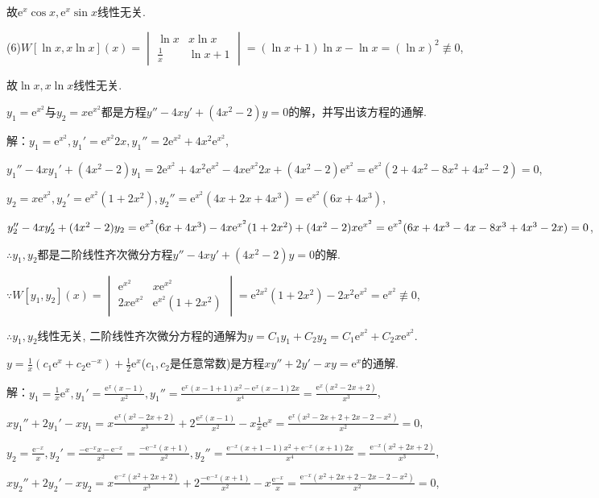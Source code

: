 \documentclass[12pt,UTF8]{ctexart}
\newcommand{\me}[0]{\mathrm e}
\begin{document}
\begin{enumerate}
故$\me^x\cos x,\me^x\sin x$线性无关.

(6)$W[\ln x,x\ln x](x)=\begin{vmatrix}\ln x&x\ln x\\ \frac1x&\ln x+1\end{vmatrix}=(\ln x+1)\ln x-\ln x=(\ln x)^2\not\equiv0$,

故$\ln x,x\ln x$线性无关.

$y_1=\me^{x^2}$与$y_2=x\me^{x^2}$都是方程$y''-4xy'+(4x^2-2)y=0$的解，并写出该方程的通解.

解：$y_1=\me^{x^2},y_1'=\me^{x^2}2x,y_1''=2\me^{x^2}+4x^2\me^{x^2}$,

$y_1''-4xy_1'+(4x^2-2)y_1=2\me^{x^2}+4x^2\me^{x^2}-4x\me^{x^2}2x+(4x^2-2)\me^{x^2}=\me^{x^2}(2+4x^2-8x^2+4x^2-2)=0$,

$y_2=x\me^{x^2},y_2'=\me^{x^2}(1+2x^2),y_2''=\me^{x^2}(4x+2x+4x^3)=\me^{x^2}(6x+4x^3)$,

$y_2''-4xy_2'+(4x^2-2)y_2=\me^{x^2}(6x+4x^3)-4x\me^{x^2}(1+2x^2)+(4x^2-2)x\me^{x^2}\\
=\me^{x^2}(6x+4x^3-4x-8x^3+4x^3-2x)=0$,

$\therefore y_1,y_2$都是二阶线性齐次微分方程$y''-4xy'+(4x^2-2)y=0$的解.

$\because W[y_1,y_2](x)=\begin{vmatrix}\me^{x^2}&x\me^{x^2}\\2x\me^{x^2}&\me^{x^2}(1+2x^2)\end{vmatrix}=\me^{2x^2}(1+2x^2)-2x^2\me^{x^2}=\me^{x^2}\not\equiv0$,

$\therefore y_1,y_2$线性无关, 二阶线性齐次微分方程的通解为$y=C_1y_1+C_2y_2=C_1\me^{x^2}+C_2x\me^{x^2}$.

$y=\frac1x(c_1\me^x+c_2\me^{-x})+\frac12\me^x$($c_1,c_2$是任意常数)是方程$xy''+2y'-xy=\me^x$的通解.

解：$y_1=\frac1x\me^x,y_1'=\frac{\me^x(x-1)}{x^2},y_1''=\frac{\me^x(x-1+1)x^2-\me^x(x-1)2x}{x^4}=\frac{\me^x(x^2-2x+2)}{x^3}$,

$xy_1''+2y_1'-xy_1=x\frac{\me^x(x^2-2x+2)}{x^3}+2\frac{\me^x(x-1)}{x^2}-x\frac1x\me^x=\frac{\me^x(x^2-2x+2+2x-2-x^2)}{x^2}=0$,

$y_2=\frac{\me^{-x}}x,y_2'=\frac{-\me^{-x}x-\me^{-x}}{x^2}=\frac{-\me^{-x}(x+1)}{x^2},y_2''=\frac{\me^{-x}(x+1-1)x^2+\me^{-x}(x+1)2x}{x^4}=\frac{\me^{-x}(x^2+2x+2)}{x^3}$,

$xy_2''+2y_2'-xy_2=x\frac{\me^{-x}(x^2+2x+2)}{x^3}+2\frac{-\me^{-x}(x+1)}{x^2}-x\frac{\me^{-x}}x=\frac{\me^{-x}(x^2+2x+2-2x-2-x^2)}{x^2}=0$,


\end{enumerate}
\end{document}
